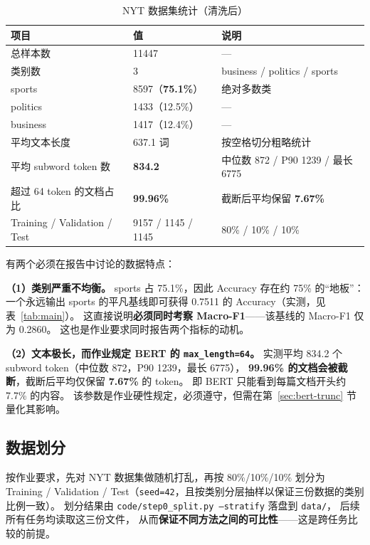 \documentclass[12pt,a4paper]{ctexart}
\newcommand{\fpath}[1]{\texttt{#1}}
\newcommand{\best}[1]{\textbf{#1}}
\begin{document}
\begin{table}[htbp]
\centering
\small
\caption{NYT 数据集统计（清洗后）}
\label{tab:dataset}
\begin{tabular}{lll}
\toprule
项目 & 值 & 说明 \\
\midrule
总样本数 & 11447 & — \\
类别数 & 3 & business / politics / sports \\
sports & 8597（\best{75.1\%}） & 绝对多数类 \\
politics & 1433（12.5\%） & — \\
business & 1417（12.4\%） & — \\
平均文本长度 & 637.1 词 & 按空格切分粗略统计 \\
平均 subword token 数 & \best{834.2} & 中位数 872 / P90 1239 / 最长 6775 \\
超过 64 token 的文档占比 & \best{99.96\%} & 截断后平均保留 \best{7.67\%} \\
Training / Validation / Test & 9157 / 1145 / 1145 & 80\% / 10\% / 10\% \\
\bottomrule
\end{tabular}
\end{table}

有两个必须在报告中讨论的数据特点：

\textbf{（1）类别严重不均衡。}
sports 占 75.1\%，因此 Accuracy 存在约 75\% 的``地板''：
一个永远输出 sports 的平凡基线即可获得 0.7511 的 Accuracy（实测，见表~\ref{tab:main}）。
这直接说明\textbf{必须同时考察 Macro-F1}——该基线的 Macro-F1 仅为 0.2860。
这也是作业要求同时报告两个指标的动机。

\textbf{（2）文本极长，而作业规定 BERT 的 \fpath{max\_length=64}。}
实测平均 834.2 个 subword token（中位数 872，P90 1239，最长 6775），
\textbf{99.96\% 的文档会被截断}，截断后平均仅保留 \textbf{7.67\%} 的 token。
即 BERT 只能看到每篇文档开头约 7.7\% 的内容。
该参数是作业硬性规定，必须遵守，但需在第~\ref{sec:bert-trunc} 节量化其影响。

\subsection{数据划分}

按作业要求，先对 NYT 数据集做随机打乱，再按 80\%/10\%/10\% 划分为
Training / Validation / Test（\fpath{seed=42}，且按类别分层抽样以保证三份数据的类别比例一致）。
划分结果由 \fpath{code/step0\_split.py --stratify} 落盘到 \fpath{data/}，
后续所有任务均读取这三份文件，
从而\textbf{保证不同方法之间的可比性}——这是跨任务比较的前提。
\end{document}
